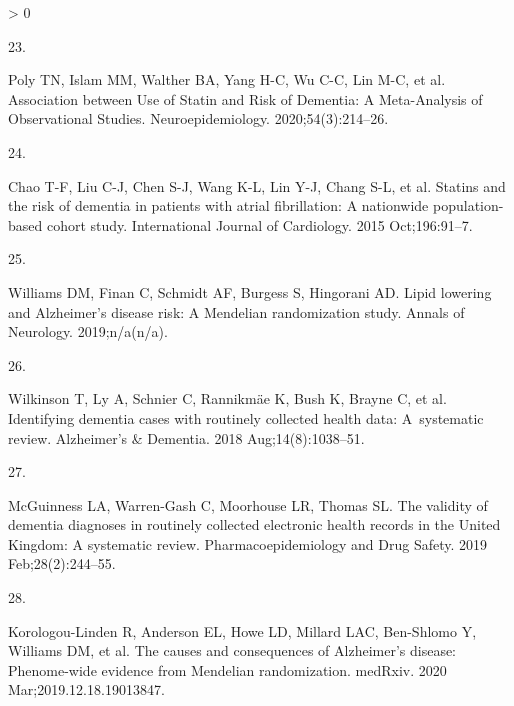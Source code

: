 \documentclass[
]{article}
\newlength{\cslhangindent}
\newlength{\csllabelwidth}
\newenvironment{CSLReferences}[2] %
 {%
  \setlength{\parindent}{0pt}
  \ifodd #1 \everypar{\setlength{\hangindent}{\cslhangindent}}\ignorespaces\fi
  \ifnum #2 > 0
  \setlength{\parskip}{#2\baselineskip}
  \fi
 }%
 {}
\newcommand{\CSLLeftMargin}[1]{\parbox[t]{\csllabelwidth}{#1}}
\newcommand{\CSLRightInline}[1]{\parbox[t]{\linewidth - \csllabelwidth}{#1}\break}
\begin{document}
\begin{CSLReferences}{0}{0}
\leavevmode\hypertarget{ref-poly2020}{}%
\CSLLeftMargin{23. }
\CSLRightInline{Poly TN, Islam MM, Walther BA, Yang H-C, Wu C-C, Lin M-C, et al. Association between {Use} of {Statin} and {Risk} of {Dementia}: {A Meta}-{Analysis} of {Observational Studies}. Neuroepidemiology. 2020;54(3):214--26. }

\leavevmode\hypertarget{ref-chao2015}{}%
\CSLLeftMargin{24. }
\CSLRightInline{Chao T-F, Liu C-J, Chen S-J, Wang K-L, Lin Y-J, Chang S-L, et al. Statins and the risk of dementia in patients with atrial fibrillation: {A} nationwide population-based cohort study. International Journal of Cardiology. 2015 Oct;196:91--7. }

\leavevmode\hypertarget{ref-williams}{}%
\CSLLeftMargin{25. }
\CSLRightInline{Williams DM, Finan C, Schmidt AF, Burgess S, Hingorani AD. Lipid lowering and {Alzheimer}'s disease risk: A {Mendelian} randomization study. Annals of Neurology. 2019;n/a(n/a). }

\leavevmode\hypertarget{ref-wilkinson2018}{}%
\CSLLeftMargin{26. }
\CSLRightInline{Wilkinson T, Ly A, Schnier C, Rannikmäe K, Bush K, Brayne C, et al. Identifying dementia cases with routinely collected health data: {A}~systematic review. Alzheimer's \& Dementia. 2018 Aug;14(8):1038--51. }

\leavevmode\hypertarget{ref-mcguinness2019b}{}%
\CSLLeftMargin{27. }
\CSLRightInline{McGuinness LA, Warren-Gash C, Moorhouse LR, Thomas SL. The validity of dementia diagnoses in routinely collected electronic health records in the {United Kingdom}: {A} systematic review. Pharmacoepidemiology and Drug Safety. 2019 Feb;28(2):244--55. }

\leavevmode\hypertarget{ref-korologou-linden2020}{}%
\CSLLeftMargin{28. }
\CSLRightInline{Korologou-Linden R, Anderson EL, Howe LD, Millard LAC, Ben-Shlomo Y, Williams DM, et al. The causes and consequences of {Alzheimer}'s disease: Phenome-wide evidence from {Mendelian} randomization. medRxiv. 2020 Mar;2019.12.18.19013847. }

\end{CSLReferences}
\end{document}
